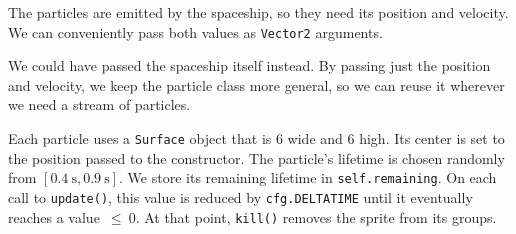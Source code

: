 The particles are emitted by the spaceship, so they need its position and velocity. We can conveniently pass both values as \texttt{Vector2} arguments.

\begin{hintbox}
	We could have passed the spaceship itself instead. By passing just the position and velocity, we keep the particle class more general, so we can reuse it wherever we need a stream of particles.
\end{hintbox}

Each particle uses a \texttt{Surface} object that is \SI{6}{\pixel} wide and \SI{6}{\pixel} high. Its center is set to the position passed to the constructor. The particle's lifetime is chosen randomly from $[\SI{0.4}{\second}, \SI{0.9}{\second}]$. We store its remaining lifetime in \texttt{self.remaining}. On each call to \texttt{update()}, this value is reduced by \texttt{cfg.DELTATIME} until it eventually reaches a value~$\leq~0$. At that point, \texttt{kill()} removes the sprite from its groups.

